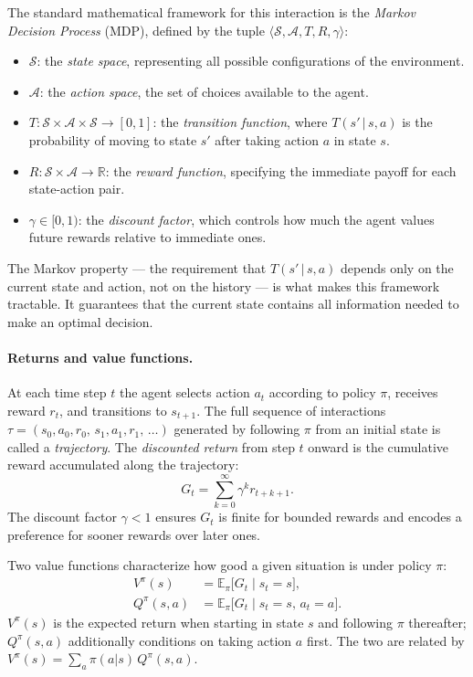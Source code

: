 The standard mathematical framework for this interaction is the \emph{Markov Decision Process} (MDP), defined by the tuple $\langle \mathcal{S}, \mathcal{A}, T, R, \gamma \rangle$:
\begin{itemize}
  \item $\mathcal{S}$: the \emph{state space}, representing all possible configurations of the environment.
  \item $\mathcal{A}$: the \emph{action space}, the set of choices available to the agent.
  \item $T: \mathcal{S} \times \mathcal{A} \times \mathcal{S} \rightarrow [0,1]$: the \emph{transition function}, where $T(s'\,|\,s,a)$ is the probability of moving to state $s'$ after taking action $a$ in state $s$.
  \item $R: \mathcal{S} \times \mathcal{A} \rightarrow \mathbb{R}$: the \emph{reward function}, specifying the immediate payoff for each state-action pair.
  \item $\gamma \in [0,1)$: the \emph{discount factor}, which controls how much the agent values future rewards relative to immediate ones.
\end{itemize}

The Markov property — the requirement that $T(s'\,|\,s,a)$ depends only on the current state and action, not on the history — is what makes this framework tractable. It guarantees that the current state contains all information needed to make an optimal decision.

\paragraph{Returns and value functions.}
At each time step $t$ the agent selects action $a_t$ according to policy $\pi$, receives reward $r_t$, and transitions to $s_{t+1}$. The full sequence of interactions $\tau = (s_0, a_0, r_0,\, s_1, a_1, r_1,\, \ldots)$ generated by following $\pi$ from an initial state is called a \emph{trajectory}. The \emph{discounted return} from step $t$ onward is the cumulative reward accumulated along the trajectory:
\begin{equation}
  G_t = \sum_{k=0}^{\infty} \gamma^k r_{t+k+1}.
  \label{eq:return}
\end{equation}
The discount factor $\gamma < 1$ ensures $G_t$ is finite for bounded rewards and encodes a preference for sooner rewards over later ones.

Two value functions characterize how good a given situation is under policy $\pi$:
\begin{align}
  V^{\pi}(s)    & = \mathbb{E}_{\pi}\bigl[G_t \mid s_t = s\bigr], \label{eq:vfunction}            \\
  Q^{\pi}(s, a) & = \mathbb{E}_{\pi}\bigl[G_t \mid s_t = s,\, a_t = a\bigr]. \label{eq:qfunction}
\end{align}
$V^{\pi}(s)$ is the expected return when starting in state $s$ and following $\pi$ thereafter; $Q^{\pi}(s,a)$ additionally conditions on taking action $a$ first. The two are related by $V^{\pi}(s) = \sum_a \pi(a|s)\, Q^{\pi}(s,a)$.

